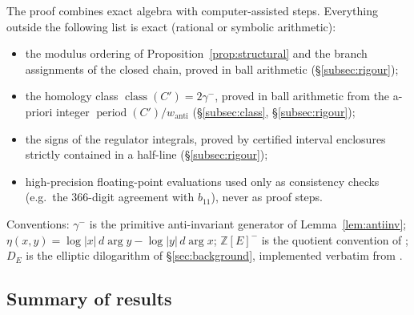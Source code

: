 \documentclass[11pt]{amsart}
\theoremstyle{definition}
\theoremstyle{remark}
\newcommand{\Z}{\mathbb{Z}}
\DeclareMathOperator{\period}{period}
\DeclareMathOperator{\class}{class}
\begin{document}
The proof combines exact algebra with computer-assisted steps. Everything
outside the following list is exact (rational or symbolic arithmetic):
\begin{itemize}
  \item the modulus ordering of Proposition~\ref{prop:structural} and the
  branch assignments of the closed chain, proved in ball arithmetic
  (\S\ref{subsec:rigour});
  \item the homology class $\class(C')=2\gamma^-$, proved in ball arithmetic
  from the a-priori integer $\period(C')/w_{\mathrm{anti}}$
  (\S\ref{subsec:class}, \S\ref{subsec:rigour});
  \item the signs of the regulator integrals, proved by certified interval
  enclosures strictly contained in a half-line (\S\ref{subsec:rigour});
  \item high-precision floating-point evaluations used only as consistency
  checks (e.g.\ the $366$-digit agreement with $b_{11}$), never as proof
  steps.
\end{itemize}
Conventions: $\gamma^-$ is the primitive anti-invariant generator of
Lemma~\ref{lem:antiinv}; $\eta(x,y)=\log|x|\,d\arg y-\log|y|\,d\arg x$;
$\Z[E]^-$ is the quotient convention of \cite{LalinRam}; $D_E$ is the
elliptic dilogarithm of \S\ref{sec:background}, implemented verbatim from
\cite[Def.~5, eq.~(10)]{LalinRam}.

\subsection{Summary of results}
\end{document}
